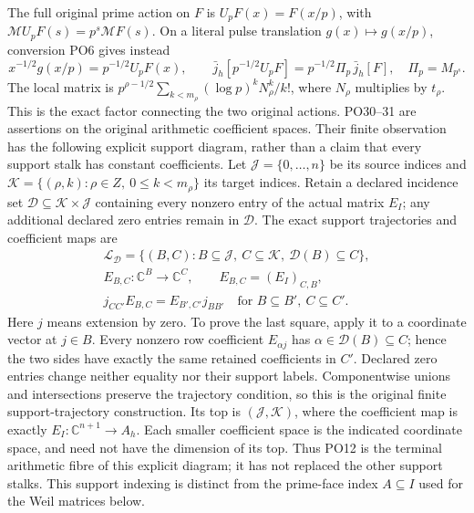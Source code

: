 \documentclass[11pt]{article}
\newcommand{\C}{\mathbb C}
\newcommand{\M}{\mathcal M}
\begin{document}
The full original prime action on \(F\) is
\(U_pF(x)=F(x/p)\), with \(\M U_pF(s)=p^s\M F(s)\).
On a literal pulse translation \(g(x)\mapsto g(x/p)\),
conversion PO6 gives instead
\[
 x^{-1/2}g(x/p)=p^{-1/2}U_pF(x),\qquad
 \bar j_h[p^{-1/2}U_pF]
    =p^{-1/2}\Pi_p\,\bar j_h[F],\quad
 \Pi_p=M_{p^s}.
 \tag{PO31}\label{po:prime-factor}
\]
The local matrix is
\(p^{\rho-1/2}\sum_{k<m_\rho}
(\log p)^kN_\rho^k/k!\), where \(N_\rho\) multiplies by
\(t_\rho\). This is the exact factor connecting the two
original actions.
PO30--31 are assertions on the original arithmetic coefficient
spaces. Their finite observation has the following explicit
support diagram, rather than a claim that every support stalk
has constant coefficients. Let \(\mathcal J=\{0,\ldots,n\}\)
be its source indices and
\(\mathcal K=\{(\rho,k):\rho\in Z,\ 0\le k<m_\rho\}\)
its target indices. Retain a declared incidence set
\(\mathcal D\subseteq\mathcal K\times\mathcal J\) containing
every nonzero entry of the actual matrix \(E_I\); any additional
declared zero entries remain in \(\mathcal D\).
The exact support trajectories and coefficient maps are
\[
 \begin{gathered}
 \mathcal L_{\mathcal D}
  =\{(B,C):B\subseteq\mathcal J,\ C\subseteq\mathcal K,\
                         \mathcal D(B)\subseteq C\},\\
 E_{B,C}:\C^B\longrightarrow\C^C,\qquad
 E_{B,C}=(E_I)_{C,B},\\
 j_{CC'}E_{B,C}=E_{B',C'}j_{BB'}
       \quad\text{for }B\subseteq B',\ C\subseteq C'.
 \end{gathered}
 \tag{PO54}\label{po:support-square}
\]
Here \(j\) means extension by zero. To prove the last square,
apply it to a coordinate vector at \(j\in B\).
Every nonzero row coefficient \(E_{\alpha j}\) has
\(\alpha\in\mathcal D(B)\subseteq C\); hence the two sides
have exactly the same retained coefficients in \(C'\).
Declared zero entries change neither equality nor their
support labels. Componentwise unions and intersections preserve
the trajectory condition, so this is the original finite
support-trajectory construction. Its top is
\((\mathcal J,\mathcal K)\), where the coefficient map is
exactly \(E_I:\C^{n+1}\to A_h\).
Each smaller coefficient space is the indicated coordinate
space, and need not have the dimension of its top.
Thus PO12 is the terminal arithmetic fibre of this explicit
diagram; it has not replaced the other support stalks.
This support indexing is distinct from the prime-face index
\(A\subseteq I\) used for the Weil matrices below.
\end{document}

